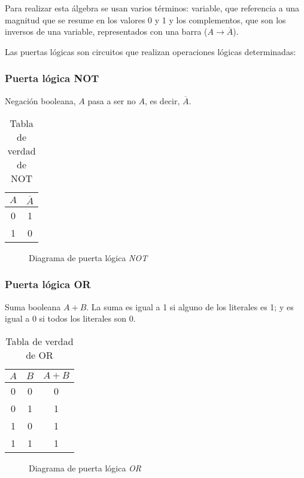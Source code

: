 \documentclass[12pt]{article}
\begin{document}
		Para realizar esta álgebra se usan varios términos: variable, que referencia a una magnitud que se resume en los valores 0 y 1 y los complementos, que son los inversos de una variable, representados con una barra ($A \rightarrow \overline{A}$).

		Las puertas lógicas son circuitos que realizan operaciones lógicas determinadas:

		\subsubsection{\textbf{Puerta lógica NOT}}

		Negación booleana, $A$ pasa a ser no $A$, es decir, $\overline{A}$.

		\begin{multicols}{2}

			\begin{table}[H]
				\centering
				\begin{tabular}{|c|c|}
					$A$ & $\overline{A}$ \\
					\hline
					0 & 1 \\
					1 & 0
				\end{tabular}
				\caption{Tabla de verdad de NOT}
				\label{tab:not}
			\end{table}

			\columnbreak
			\newpage
			\begin{figure}[H]
				\centering
				
				\caption{Diagrama de puerta lógica \textit{NOT} \cite{logic_gate}}
				\label{fig:not}
			\end{figure}
		\end{multicols}

		\subsubsection{\textbf{Puerta lógica OR}}

		Suma booleana $A + B$. La suma es igual a 1 si alguno de los literales es 1; y es igual a 0 si todos los literales son 0.

		\begin{multicols}{2}

			\begin{table}[H]
				\centering
				\begin{tabular}{|c c|c}
					$A$ & $B$ & $A + B$ \\
					\hline
					0 & 0 & 0 \\
					0 & 1 & 1 \\
					1 & 0 & 1 \\
					1 & 1 & 1
				\end{tabular}
				\caption{Tabla de verdad de OR}
				\label{tab:my_label}
			\end{table}



			\columnbreak
			\newpage
			\begin{figure}[H]
				\centering
				
				\caption{Diagrama de puerta lógica \textit{OR} \cite{logic_gate}}
				\label{fig:or}
			\end{figure}

		\end{multicols}
\end{document}
